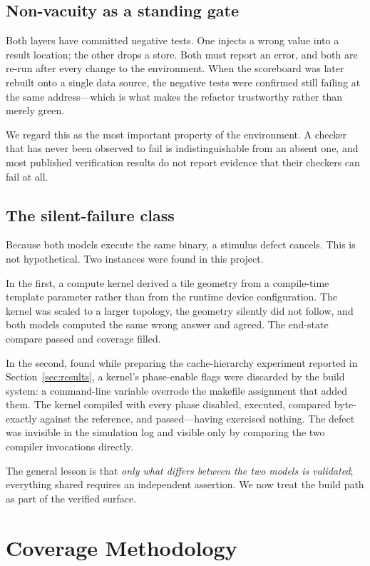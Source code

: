 \documentclass[conference]{IEEEtran}
\begin{document}
\subsection{Non-vacuity as a standing gate}
Both layers have committed negative tests. One injects a wrong value into
a result location; the other drops a store. Both must report an error, and
both are re-run after every change to the environment. When the scoreboard
was later rebuilt onto a single data source, the negative tests were
confirmed still failing at the same address---which is what makes the
refactor trustworthy rather than merely green.

We regard this as the most important property of the environment. A
checker that has never been observed to fail is indistinguishable from an
absent one, and most published verification results do not report
evidence that their checkers can fail at all.

\subsection{The silent-failure class}
\label{sec:silentclass}
Because both models execute the same binary, a stimulus defect cancels.
This is not hypothetical. Two instances were found in this project.

In the first, a compute kernel derived a tile geometry from a compile-time
template parameter rather than from the runtime device configuration. The
kernel was scaled to a larger topology, the geometry silently did not
follow, and both models computed the same wrong answer and agreed. The
end-state compare passed and coverage filled.

In the second, found while preparing the cache-hierarchy experiment
reported in Section~\ref{sec:results}, a kernel's phase-enable flags were
discarded by the build system: a command-line variable overrode the
makefile assignment that added them. The kernel compiled with every phase
disabled, executed, compared byte-exactly against the reference, and
passed---having exercised nothing. The defect was invisible in the
simulation log and visible only by comparing the two compiler invocations
directly.

The general lesson is that \emph{only what differs between the two models
is validated}; everything shared requires an independent assertion. We now
treat the build path as part of the verified surface.

\section{Coverage Methodology}
\end{document}

